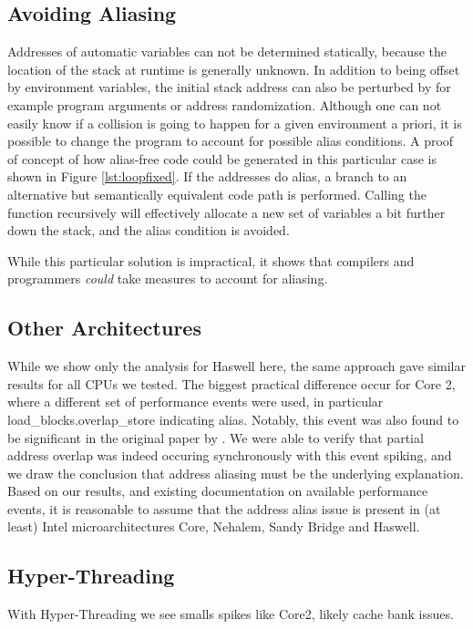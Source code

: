\documentclass[prodmode,acmtaco]{acmsmall}
\begin{document}
\subsection{Avoiding Aliasing}
Addresses of automatic variables can not be determined statically, because the location of the stack at runtime is generally unknown.
In addition to being offset by environment variables, the initial stack address can also be perturbed by for example program arguments or address randomization.
Although one can not easily know if a collision is going to happen for a given environment a priori, it is possible to change the program to account for possible alias conditions.
A proof of concept of how alias-free code could be generated in this particular case is shown in Figure \ref{lst:loopfixed}.
If the addresses do alias, a branch to an alternative but semantically equivalent code path is performed.
Calling the function recursively will effectively allocate a new set of variables a bit further down the stack, and the alias condition is avoided.

While this particular solution is impractical, it shows that compilers and programmers \emph{could} take measures to account for aliasing.

\subsection{Other Architectures}
While we show only the analysis for Haswell here, the same approach gave similar results for all CPUs we tested.
The biggest practical difference occur for Core 2, where a different set of performance events were used, in particular load\_blocks.overlap_store indicating alias.
Notably, this event was also found to be significant in the original paper by .
We were able to verify that partial address overlap was indeed occuring synchronously with this event spiking, and we draw the conclusion that address aliasing must be the underlying explanation.
Based on our results, and existing documentation on available performance events, it is reasonable to assume that the address alias issue is present in (at least) Intel microarchitectures Core, Nehalem, Sandy Bridge and Haswell.

\subsection{Hyper-Threading}
With Hyper-Threading we see smalls spikes like Core2, likely cache bank issues. %
\end{document}
